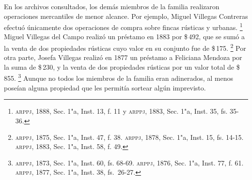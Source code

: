 \documentclass[14pt,twoside,final]{extbook} %
\let\oldfootnote\footnote
\renewcommand\footnote[1]{%
\oldfootnote{\hspace{1mm}#1}}
\begin{document}
En los archivos consultados, los demás miembros de la familia realizaron operaciones mercantiles de menor alcance. Por ejemplo, Miguel Villegas Contreras efectuó únicamente dos operaciones de compra sobre fincas rústicas y urbanas.\footnote{\textsc{arppj}, 1888, Sec. 1"a, Inst. 13, f. 11 y \textsc{arppj}, 1883, Sec. 1"a, Inst. 35, fs. 35-36.} Miguel Villegas del Campo realizó un préstamo en 1883 por \$\,492, que se sumó a la venta de dos propiedades rústicas cuyo valor en su conjunto fue de \$\,175.\footnote{\textsc{arppj}, 1875, Sec. 1"a, Inst. 47, f. 38. \textsc{arppj}, 1878, Sec. 1"a, Inst. 15, fs. 14-15. \textsc{arppj}, 1883, Sec. 1"a, Inst. 58, f. 49.} Por otra parte, Josefa Villegas realizó en 1877 un préstamo a Feliciana Mendoza por la suma de \$\,230, y la venta de dos propiedades rústicas por un valor total de \$\,855.\footnote{\textsc{arppj}, 1873, Sec. 1"a, Inst. 60, fs. 68-69. \textsc{arppj}, 1876, Sec. 1"a, Inst. 77, f. 61. \textsc{arppj}, 1877, Sec. 1"a, Inst. 38, fs.~26-27.} Aunque no todos los miembros de la familia eran adinerados, al menos poseían alguna propiedad que les permitía sortear algún imprevisto.
\end{document}
